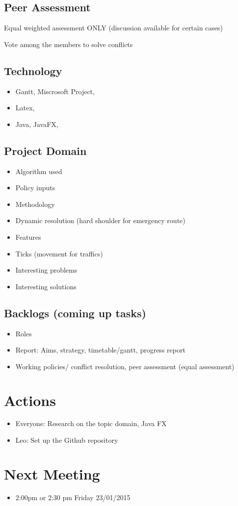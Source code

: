 \documentclass{article}
\begin{document}
\subsection {Peer Assessment}
Equal weighted assessment ONLY (discussion available for certain cases)

Vote among the members to solve conflicts 

\subsection {Technology}
\begin{itemize}
\item Gantt, Miscrosoft Project, 
\item Latex,  
\item Java, JavaFX,
\end{itemize}

\subsection{Project Domain}
\begin{itemize}
\item Algorithm used 
\item Policy inputs 
\item Methodology
\item Dynamic resolution (hard shoulder for emergency route)

     \item Features 
     \item Ticks (movement for traffics)
\item Interesting problems
\item Interesting solutions 
\end{itemize}


\subsection {Backlogs (coming up tasks)}
\begin{itemize}
\item Roles
\item Report: Aims, strategy, timetable/gantt, progress report
\item Working policies/ conflict resolution, peer assessment (equal assessment)
\end{itemize}

\section {Actions}
\begin{itemize}
\item Everyone: Research on the topic domain, Java FX
\item Leo: Set up the Github repository 
\end{itemize}
\section {Next Meeting}
\begin{itemize}
\item 2:00pm or 2:30 pm Friday 23/01/2015
\end{itemize}
\end{document}
